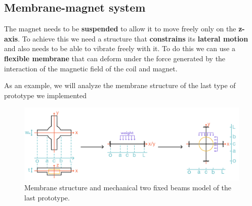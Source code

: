 \subsection{Membrane-magnet system}
\label{sec: Membrane-magnet_system}

The magnet needs to be \textbf{suspended} to allow it to move freely only on the \textbf{z-axis}.
To achieve this we need a structure that \textbf{constrains} its \textbf{lateral motion} and also needs to be able to vibrate freely with it.
To do this we can use a \textbf{flexible membrane} that can deform under the force generated by the interaction of the magnetic field of the coil and magnet. 

\begin{samepage}
    As an example, we will analyze the membrane structure of the last type of prototype we implemented %
    \nopagebreak

    \begin{figure}[H]
        \centering
        \includegraphics[width=1\linewidth]{Chapters/Chapter2/Modelling_of_Entire_System/Figures/membr_mech_model.jpg} 
        \caption[Membrane structure]{Membrane structure and mechanical two fixed beams model of the last prototype.}
        \label{fig: Membrane_structure}
    \end{figure}
\end{samepage}

